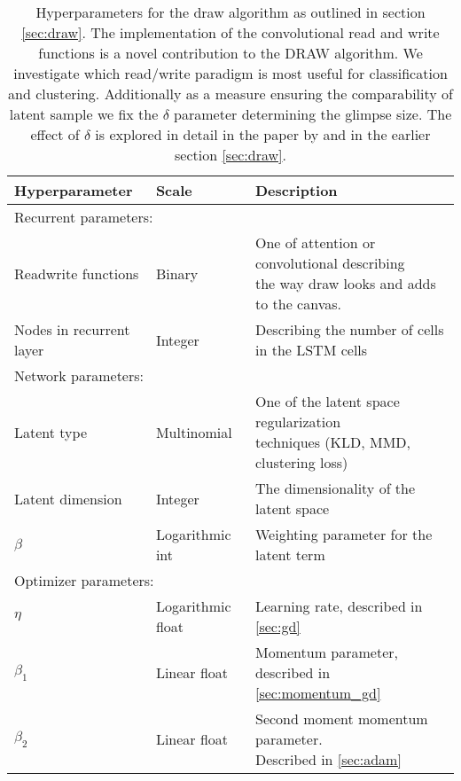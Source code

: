 \begin{table}
\centering
\caption{Hyperparameters for the draw algorithm as outlined in section \ref{sec:draw}. The implementation of the convolutional read and write functions is a novel contribution to the DRAW algorithm. We investigate which read/write paradigm is most useful for classification and clustering. Additionally as a measure ensuring the comparability of latent sample we fix the $\delta$ parameter determining the glimpse size. The effect of $\delta$ is explored in detail in the paper by \citet{Gregor2015} and in the earlier section \ref{sec:draw}.}\label{tab:draw_hyperparams}
\setlength{\extrarowheight}{15pt}
\hspace*{-0.5in}
\begin{tabular}{lll}
\toprule
Hyperparameter & Scale & Description \\
\midrule
\multicolumn{3}{l}{Recurrent parameters: } \\
\midrule
Read\/write functions & Binary & \makecell[l]{One of attention or convolutional describing  \\ the way draw looks and adds to the canvas.} \\
Nodes in recurrent layer & Integer & Describing the number of cells in the LSTM cells \\
\midrule
\multicolumn{3}{l}{Network parameters: } \\
\midrule
Latent type & Multinomial & \makecell[l]{One of the latent space regularization \\techniques (KLD, MMD, clustering loss)} \\
Latent dimension & Integer & The dimensionality of the latent space \\
$\beta$ & Logarithmic int & Weighting parameter for the latent term \\
\midrule
\multicolumn{3}{l}{Optimizer parameters: } \\
\midrule
$\eta$ & Logarithmic float & Learning rate, described in \ref{sec:gd} \\
$\beta_1$ & Linear float & Momentum parameter, described in \ref{sec:momentum_gd} \\
$\beta_2$ & Linear float & \makecell[l]{Second moment momentum parameter. \\ Described in \ref{sec:adam}}\\
\bottomrule
\end{tabular}

\end{table}

